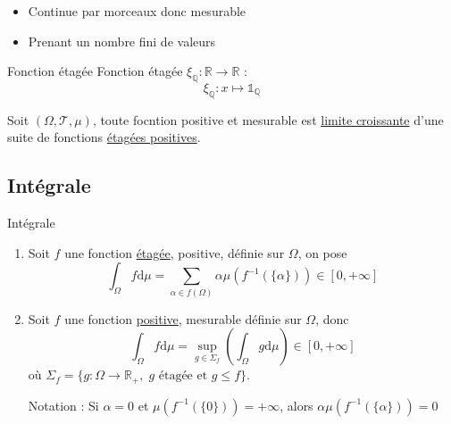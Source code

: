 \begin{myproof}{}{}
\begin{itemize}

    \item Continue par morceaux donc mesurable 
    \item Prenant un nombre fini de valeurs

\end{itemize}
\end{myproof}

\begin{Example}{Fonction étagée}{}
  Fonction étagée $\xi_ \mathbb{Q} : \mathbb{R} \to \mathbb{R}$ :
\begin{equation}
  \xi _{\mathbb{Q}} : x \mapsto \mathbb{1} _{\mathbb{Q}}
\end{equation}
\end{Example}

\begin{Prop}{}{}
Soit $(\Omega, \mathcal{T}, \mu)$, toute focntion positive et mesurable est \underline{limite croissante} d'une suite de fonctions \underline{étagées positives}.
\end{Prop}

\subsection{Intégrale} %
\label{sub:Intégrale}

\begin{Definition}[colbacktitle=red!75!black]{Intégrale}{}
\begin{enumerate}

    \item Soit $f$ une fonction \underline{étagée}, positive, définie sur $\Omega$, on pose 
      \begin{equation}
        \int_{\Omega}^{} f \mathrm{d} \mu = \sum_{\alpha \in f(\Omega)}^{} \alpha \mu (f ^{-1} ( \{\alpha\})) \in [0, + \infty]
      \end{equation}

    \item Soit $f$ une fonction \underline{positive}, mesurable définie sur $\Omega$, donc 
      \begin{equation}
        \int_{\Omega}^{} f \mathrm{d} \mu = \underset{g \in \Sigma_f}{\sup} \left( \int_{\Omega}^{} g \mathrm{d} \mu\right) \in [0, + \infty]
      \end{equation}
      où $\Sigma _f = \{g : \Omega \to \mathbb{R}_ + , \; g \text{ étagée et } g \le f \}$. 

      Notation : Si $\alpha = 0$ et $\mu(f ^{-1}(\{0\})) = + \infty$, alors $\alpha \mu( f ^{-1} (\{\alpha\})) = 0$

\end{enumerate}
\end{Definition}


